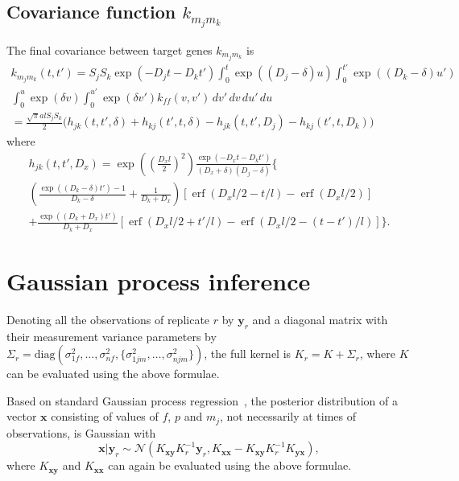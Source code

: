 \documentclass{article}
\newcommand{\erf}{\operatorname{erf}}
\begin{document}
\subsection{Covariance function $k_{m_j m_k}$}

The final covariance between target genes $k_{m_j m_k}$ is
\begin{multline}
  k_{m_j m_k}(t, t') = S_j S_k \exp(-D_j t - D_k t')
  \int_0^t \exp((D_j - \delta) u)
  \int_0^{t'} \exp((D_k - \delta) u') \\
  \int_0^u \exp(\delta v) \int_0^{u'} \exp(\delta v') k_{ff}(v, v') \, dv'\, dv\, du'\, du \\
  = \frac{\sqrt{\pi} a l S_j S_k}{2} \bigg(
  h_{jk}(t, t', \delta) + h_{kj}(t', t, \delta) 
  - h_{jk}(t, t', D_j) - h_{kj}(t', t, D_k)
  \bigg)
\end{multline}
where
\begin{multline}
  h_{jk}(t, t', D_x) = 
  \exp\left(\left(\frac{D_x l}{2}\right)^2\right)
  \frac{\exp(-D_x t - D_k t')}{(D_x + \delta) (D_j - \delta)}
  \bigg\{ 
   \\
  \left(\frac{\exp((D_k-\delta) t') - 1}{D_k-\delta} +
    \frac{1}{D_k + D_x} \right)
  [\erf(D_x l/2 - t/l) - \erf(D_x l/2)]
  \\
  + \frac{\exp((D_k+D_x)t')}{D_k+D_x}
  [\erf(D_x l/2 + t'/l)
  - \erf(D_x l/2 - (t-t')/l)]
  \bigg\}.
\end{multline}

\section{Gaussian process inference}

Denoting all the observations of replicate $r$ by $\bm y_r$ and a
diagonal matrix with their measurement variance parameters by
$\Sigma_r = \mathrm{diag}(\sigma_{1f}^2, \ldots, \sigma_{nf}^2,
\{\sigma_{1jm}^2, \ldots, \sigma_{njm}^2\})$, the
full kernel is $K_r = K + \Sigma_r$, where $K$ can be evaluated using
the above formulae.

Based on standard Gaussian process regression~\cite{Rasmussen2006},
the posterior distribution of a vector $\bm x$ consisting of values of
$f$, $p$ and $m_j$, not necessarily at times of observations, is
Gaussian with
\begin{equation}
  \label{eq:gp_posterior}
  \bm x | \bm y_r \sim \mathcal{N}(K_{\bm x \bm y} K_r^{-1} \bm y_r,
  K_{\bm x \bm x} - K_{\bm x \bm y} K_r^{-1} K_{\bm y \bm x}),
\end{equation}
where $K_{\bm x \bm y}$ and $K_{\bm x \bm x}$ can again be evaluated
using the above formulae.
\end{document}

